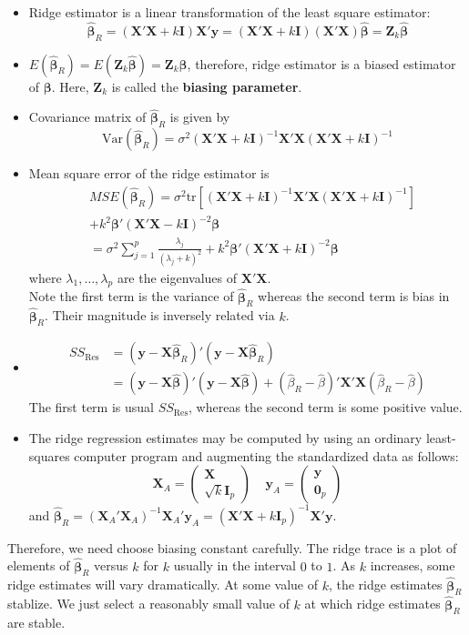 \documentclass[11pt]{article}
\newcommand{\var}{\mathrm{Var}}
\newcommand{\tr}{\mathrm{tr}}
\theoremstyle{definition}
\begin{document}
\begin{itemize}
  \item Ridge estimator is a linear transformation of the least square estimator:
  \[
\hat{\bm{\beta}}_R=(\bm{X}'\bm{X}+k\bm{I})\bm{X}'\bm{y}=(\bm{X}'\bm{X}+k\bm{I})(\bm{X}'\bm{X})\hat{\bm{\beta}}=\bm{Z}_k\hat{\bm{\beta}}
  \]
  \item $E(\hat{\bm{\beta}}_R)=E(\bm{Z}_k\hat{\bm{\beta}})=\bm{Z}_k\bm{\beta}$, therefore, ridge estimator is a biased estimator of $\bm{\beta}$. Here, $\bm{Z}_k$ is called the \textbf{biasing parameter}.
  \item Covariance matrix of $\hat{\bm{\beta}}_R$ is given by
  \[
\var(\hat{\bm{\beta}}_R)=\sigma^2(\bm{X}'\bm{X}+k\bm{I})^{-1}\bm{X}'\bm{X}(\bm{X}'\bm{X}+k\bm{I})^{-1}
  \]
  \item Mean square error of the ridge estimator is
  \begin{align*}
 &MSE(\hat{\bm{\beta}}_R)=\sigma^2\tr[(\bm{X}'\bm{X}+k\bm{I})^{-1}\bm{X}'\bm{X}(\bm{X}'\bm{X}+k\bm{I})^{-1}]
 \\&+k^2\bm{\beta}'(\bm{X}'\bm{X}-k\bm{I})^{-2}\bm{\beta}\\
  &=\sigma^2\sum_{j=1}^p \frac{\lambda_j}{(\lambda_j+k)^2}+k^2\bm{\beta}'(\bm{X}'\bm{X}+k\bm{I})^{-2}\bm{\beta}
  \end{align*}
  where $\lambda_1,\ldots,\lambda_p$ are the eigenvalues of $\bm{X}'\bm{X}$.\\Note the first term is the variance of $\hat{\bm{\beta}}_R$ whereas the second term is bias in $\hat{\bm{\beta}}_R$. Their magnitude is inversely related via $k$.
  \item \begin{align*}SS_\text{Res}&=(\bm{y}-\bm{X}\hat{\bm{\beta}}_R)'(\bm{y}-\bm{X}\hat{\bm{\beta}}_R)\\
  &=(\bm{y}-\bm{X}\hat{\bm{\beta}})'(\bm{y}-\bm{X}\hat{\bm{\beta}})+(\hat{\beta}_R-\hat{\beta})'\bm{X}'\bm{X}(\hat{\beta}_R-\hat{\beta})\end{align*}
  The first term is usual $SS_\text{Res}$, whereas the second term is some positive value.
  \item The ridge regression estimates may be computed by using an ordinary least-squares computer program and augmenting the standardized data as follows:\[
\bm{X}_A=\begin{pmatrix}\bm{X}\\\sqrt{k}\bm{I}_p\end{pmatrix} \;\;\;\;\bm{y}_A=\begin{pmatrix}\bm{y}\\\bm{0}_p\end{pmatrix}
  \]
  and $\hat{\bm{\beta}}_R=(\bm{X}_A'\bm{X}_A)^{-1}\bm{X}_A'\bm{y}_A=(\bm{X}'\bm{X}+k\bm{I}_p)^{-1}\bm{X}'\bm{y}$.
\end{itemize}
Therefore, we need choose biasing constant carefully. The ridge trace is a plot of elements of $\hat{\bm{\beta}}_R$ versus $k$ for $k$ usually in the interval $0$ to $1$. As $k$ increases, some ridge estimates will vary dramatically. At some value of $k$, the ridge estimates $\hat{\bm{\beta}}_R$ stablize. We just select a reasonably small value of $k$ at which ridge estimates $\hat{\bm{\beta}}_R$ are stable.
\end{document}
